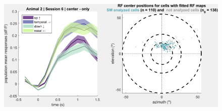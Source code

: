 
%
%

\begin{figure}[H] \centering \includegraphics[width=13cm,height=13cm,keepaspectratio]{Figures/7.Results/population/sel/6_popPlots_Animal2_Session6.png} 
\end{figure}

